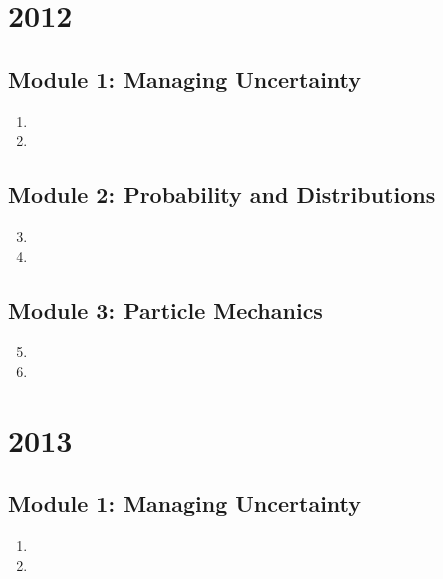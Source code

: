 \documentclass[fleqn,titlepage]{book}
\numberwithin{equation}{section}
\theoremstyle{plain}
\theoremstyle{definition}
\theoremstyle{remark}
\begin{document}
\chapter{2012}
\section{Module 1: Managing Uncertainty}
\begin{enumerate}[label=\bfseries  \arabic*.]\setcounter{enumi}{0}
\item 
\item 
\end{enumerate}
\section{Module 2: Probability and Distributions}
\begin{enumerate}[label=\bfseries  \arabic*.]\setcounter{enumi}{2}
\item 
\item 
\end{enumerate}
\section{Module 3: Particle Mechanics}
\begin{enumerate}[label=\bfseries  \arabic*.]\setcounter{enumi}{4}
\item 
\item 
\end{enumerate}

\chapter{2013}
\section{Module 1: Managing Uncertainty}
\begin{enumerate}[label=\bfseries  \arabic*.]\setcounter{enumi}{0}
\item 
\item 
\end{enumerate}
\end{document}
